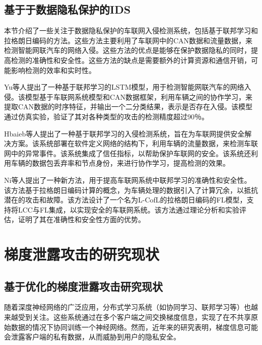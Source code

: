 \subsection{基于于数据隐私保护的IDS}

本节介绍了一些关注于数据隐私保护的车联网入侵检测系统，包括基于联邦学习和拉格朗日编码的方法。这些方法主要利用了车联网中的CAN数据和流量数据，来检测智能网联汽车的网络入侵。这些方法的优点是能够在保护数据隐私的同时，提高检测的准确性和安全性。这些方法的缺点是需要额外的计算资源和通信开销，可能影响检测的效率和实时性。

Yu等人\cite{Federated-LSTM}提出了一种基于联邦学习的LSTM模型，用于检测智能网联汽车的网络入侵。该模型基于车联网系统模型和CAN数据框架，利用车辆之间的协作学习，来提取CAN数据的时序特征，并输出一个二分类结果，表示是否存在入侵。该模型通过仿真实验，验证了其对各种类型的攻击的检测精度超过90％。

Hbaieb等人\cite{Federated_Learning_Based_IDS_Approach_for_the_IoV}提出了一种基于联邦学习的入侵检测系统，旨在为车联网提供安全解决方案。该系统部署在软件定义网络的结构下，利用车辆的流量数据，来检测车联网中的异常事件。该系统集成了信任指标，以帮助保护车联网的安全。该系统还利用车辆的数据包丢弃率和节点身份，来进行协作学习，提高检测的效果。

Ni等人\cite{Lagrange_Coded_Federated_Learning}提出了一种新方法，用于提高车联网系统中联邦学习的准确性和安全性。该方法基于拉格朗日编码计算的概念，为车辆处理的数据引入了计算冗余，以抵抗潜在的攻击和故障。该方法设计了一个名为L-CofL的拉格朗日编码的FL模型，支持将LCC与FL集成，以实现安全的车联网系统。该方法通过理论分析和实验评估，证明了其在准确性和安全性方面的优势。

\section{梯度泄露攻击的研究现状}
\subsection{基于优化的梯度泄露攻击研究现状}

随着深度神经网络的广泛应用，分布式学习系统（如协同学习、联邦学习等）也越来越受到关注。这些系统通过在多个客户端之间交换梯度信息，实现了在不共享原始数据的情况下协同训练一个神经网络。然而，近年来的研究表明，梯度信息可能会泄露客户端的私有数据，从而威胁到用户的隐私安全。

